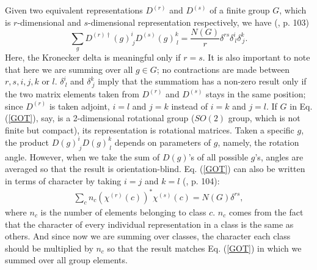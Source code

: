 \documentclass[12pt]{article}
\begin{document}
	
	Given two equivalent representations $D^{(r)}$ and $D^{(s)}$ of a finite group $G$, which is $r$-dimensional and $s$-dimensional representation respectively, we have (\cite{azee2016group}, p. 103)
	\begin{equation}
		\sum_g D^{(r)\dagger}(g)^i_{\ j}D^{(s)}(g)^k_{\ l} = \frac{N(G)}{r}\delta^{rs}\delta ^i_{\ l}\delta^k_{\ j}. \label{GOT}
	\end{equation}
	Here, the Kronecker delta is meaningful only if $r = s$. It is also important to note that here we are summing over all $g \in G$; no contractions are made between $r, s, i, j, k$ or $l$. $\delta^i_{\ l}$ and $\delta^k_{\ j}$ imply that the summatiom has a non-zero result only if the two matrix elements taken from $D^{(r)}$ and $D^{(s)}$ stays in the same position; since $D^{(r)}$ is taken adjoint, $i=l$ and $j=k$ instead of $i=k$ and $j = l$. If $G$ in Eq. (\ref{GOT}), say, is a 2-dimensional rotational group ($SO(2)$ group, which is not finite but compact), its representation is rotational matrices. Taken a specific $g$, the product $D(g)^i_{\ j}D(g)^k_{\ l}$ depends on parameters of $g$, namely, the rotation angle. However, when we take the sum of $D(g)$'s of all possible $g$'s, angles are averaged so that the result is orientation-blind. Eq. (\ref{GOT}) can also be written in terms of character by taking $i = j$ and $k = l$ (\cite{azee2016group}, p. 104):
	\begin{align}
		\sum_cn_c(\chi^{(r)}(c))^*\chi^{(s)}(c) = N(G)\delta^{rs}, \label{GOT character version}
	\end{align}
	where $n_c$ is the number of elements belonging to class $c$. $n_c$ comes from the fact that the character of every individual representation in a class is the same as others. And since now we are summing over classes, the character each class should be multiplied by $n_c$ so that the result matches Eq. (\ref{GOT}) in which we summed over all group elements.
	
\end{document}
